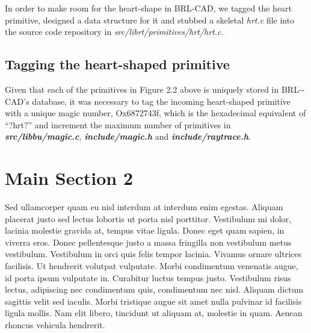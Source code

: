 In   order   to   make   room   for   the   heart­-shape   in   BRL-­CAD,   we   tagged   the   heart  
primitive,   designed   a   data   structure   for   it   and   stubbed   a   skeletal   \textit{hrt.c}   file   into  
the source code repository in \textit{src/librt/primitives/hrt/hrt.c.}

\subsection{Tagging the heart­-shaped primitive}

Given   that   each   of   the   primitives   in   Figure   2.2   above   is   uniquely   stored   in  
BRL-­CAD's   database,   it   was   necessary   to   tag   the   incoming   heart-­shaped  
primitive   with   a   unique   magic   number,   Ox6872743f,   which   is   the   hexadecimal  
equivalent   of   “?hrt?”   and   increment   the   maximum   number   of   primitives   in  
\textbf{\textit{src/libbu/magic.c}}, \textbf{\textit{include/magic.h}} and \textbf{\textit{include/raytrace.h}}.  


\section{Main Section 2}

Sed ullamcorper quam eu nisl interdum at interdum enim egestas. Aliquam placerat justo sed lectus lobortis ut porta nisl porttitor. Vestibulum mi dolor, lacinia molestie gravida at, tempus vitae ligula. Donec eget quam sapien, in viverra eros. Donec pellentesque justo a massa fringilla non vestibulum metus vestibulum. Vestibulum in orci quis felis tempor lacinia. Vivamus ornare ultrices facilisis. Ut hendrerit volutpat vulputate. Morbi condimentum venenatis augue, id porta ipsum vulputate in. Curabitur luctus tempus justo. Vestibulum risus lectus, adipiscing nec condimentum quis, condimentum nec nisl. Aliquam dictum sagittis velit sed iaculis. Morbi tristique augue sit amet nulla pulvinar id facilisis ligula mollis. Nam elit libero, tincidunt ut aliquam at, molestie in quam. Aenean rhoncus vehicula hendrerit.
